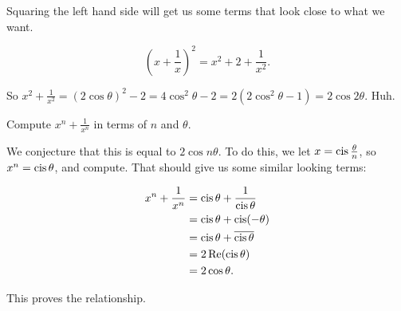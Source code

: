 \documentclass[../gatm_answers.tex]{subfiles}
\begin{document}
Squaring the left hand side will get us some terms that look close to what we want.

$$\left(x + \frac{1}{x}\right)^2 = x^2 + 2 + \frac{1}{x^2}.$$

So $x^2 + \frac{1}{x^2} = (2\cos\theta)^2 - 2 = 4\cos^2\theta - 2 = 2 (2\cos^2\theta - 1) = 2\cos 2\theta$. Huh.

\begin{inner_problem}
\item Compute $x^n+\frac{1}{x^n}$ in terms of $n$ and $\theta$.
\end{inner_problem}

We conjecture that this is equal to $2\cos n\theta$. To do this, we let $x=\operatorname{cis} \frac{\theta}{n}$, so $x^n = \operatorname{cis}\theta$, and compute. That should give us some similar looking terms:

\begin{align*}
x^n + \frac{1}{x^n} &= \operatorname{cis} \theta + \frac{1}{\operatorname{cis} \theta} \\
&= \operatorname{cis}\theta + \operatorname{cis} (-\theta) \\
&= \operatorname{cis}\theta + \overline{\operatorname{cis}\theta} \\
&= 2 \operatorname{Re}(\operatorname{cis} \theta) \\
&= 2 \cos\theta.
\end{align*}

This proves the relationship.
\end{document}
